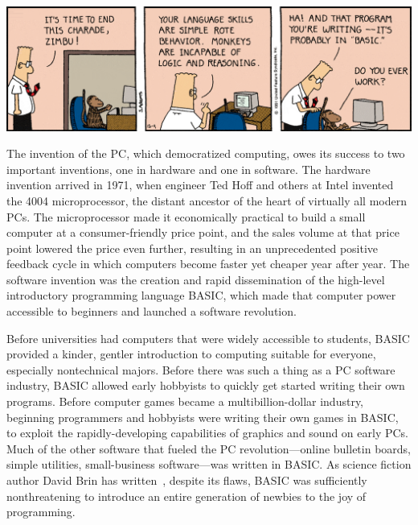 

\noindent\includegraphics[width=\textwidth]{figs/dilbert-1991-12-04.png}

The invention of the PC, which democratized computing, owes its success
to two important inventions, one in hardware and one in software.
The hardware invention arrived in 1971, when engineer Ted Hoff and others
at Intel invented the 4004 microprocessor, the distant ancestor of
the heart of virtually all modern PCs.  The microprocessor made it
economically practical to build a small computer at a consumer-friendly price
point, and the sales volume at that price point lowered the price even
further, resulting in an unprecedented positive feedback cycle in
which computers become faster yet cheaper year after year.
The software invention was the creation and rapid dissemination of the
high-level introductory programming language BASIC, which made that
computer power accessible to beginners and launched a software revolution.

Before universities had computers that were widely accessible to students, BASIC
provided a kinder, gentler introduction to computing suitable for
everyone, especially nontechnical majors.
Before there was such a thing as a PC software industry, 
BASIC allowed early hobbyists to quickly get started writing their own
programs.
Before computer games became a multibillion-dollar industry, beginning
programmers and hobbyists were writing their own games in BASIC, to
exploit the rapidly-developing capabilities of graphics and sound on
early PCs. 
Much of the other software that fueled the PC revolution---online
bulletin boards, simple utilities, small-business software---was written
in BASIC. 
As science fiction author David Brin has written~\cite{why_johnny_cant_code},
despite its flaws, BASIC
was sufficiently nonthreatening to introduce an entire generation of
newbies to the joy of programming.

